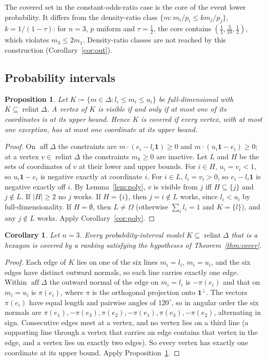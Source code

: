 \documentclass[11pt]{article}
\newcommand{\one}{\mathbf{1}}
\DeclareMathOperator{\relint}{relint}
\DeclareMathOperator{\aff}{aff}
\theoremstyle{plain}
\newtheorem{proposition}[theorem]{Proposition}
\newtheorem{corollary}[theorem]{Corollary}
\theoremstyle{definition}
\theoremstyle{remark}
\begin{document}
The covered set in the constant-odds-ratio case is the core of the event lower
probability. It differs from the density-ratio class $\{m:m_i/p_i\le km_j/p_j\}$,
$k=1/(1-\tau)$: for $n=3$, $p$ uniform and $\tau=\frac12$, the core contains
$(\frac15,\frac3{10},\frac12)$, which violates $m_3\le2m_1$. Density-ratio classes are not
reached by this construction (Corollary~\ref{cor:out}).

\subsection{Probability intervals}

\begin{proposition}\label{prop:pri}
Let $K\coloneqq\{m\in\Delta:l_i\le m_i\le u_i\}$ be full-dimensional with $K\subseteq
\relint\Delta$. A vertex of $K$ is visible if and only if at most one of its coordinates is
at its upper bound. Hence $K$ is covered if every vertex, with at most one exception, has
at most one coordinate at its upper bound.
\end{proposition}

\begin{proof}
On $\aff\Delta$ the constraints are $m\cdot(e_i-l_i\one)\ge0$ and $m\cdot(u_i\one-e_i)
\ge0$; at a vertex $v\in\relint\Delta$ the constraints $m_k\ge0$ are inactive. Let $L$ and
$H$ be the sets of coordinates of $v$ at their lower and upper bounds. For $i\in H$,
$u_i=v_i<1$, so $u_i\one-e_i$ is negative exactly at coordinate $i$. For $i\in L$,
$l_i=v_i>0$, so $e_i-l_i\one$ is negative exactly off $i$. By Lemma~\ref{lem:poly}, $v$ is
visible from $j$ iff $H\subseteq\{j\}$ and $j\notin L$. If $|H|\ge2$ no $j$ works. If
$H=\{i\}$, then $j=i\notin L$ works, since $l_i<u_i$ by full-dimensionality. If
$H=\emptyset$, then $L\neq\Omega$ (otherwise $\sum_il_i=1$ and $K=\{l\}$), and any $j\notin
L$ works. Apply Corollary~\ref{cor:poly}.
\end{proof}

\begin{corollary}\label{cor:hexagon}
Let $n=3$. Every probability-interval model $K\subseteq\relint\Delta$ that is a hexagon is
covered by a ranking satisfying the hypotheses of Theorem~\ref{thm:cover}.
\end{corollary}

\begin{proof}
Each edge of $K$ lies on one of the six lines $m_i=l_i$, $m_i=u_i$, and the six edges have
distinct outward normals, so each line carries exactly one edge. Within $\aff\Delta$ the
outward normal of the edge on $m_i=l_i$ is $-\pi(e_i)$ and that on $m_i=u_i$ is $\pi(e_i)$,
where $\pi$ is the orthogonal projection onto $\one^\perp$. The vectors $\pi(e_i)$ have
equal length and pairwise angles of $120^\circ$, so in angular order the six normals are
$\pi(e_1),-\pi(e_3),\pi(e_2),-\pi(e_1),\pi(e_3),-\pi(e_2)$, alternating in sign. Consecutive
edges meet at a vertex, and no vertex lies on a third line (a supporting line through a
vertex that carries an edge contains that vertex in the edge, and a vertex lies on exactly
two edges). So every vertex has exactly one coordinate at its upper bound. Apply
Proposition~\ref{prop:pri}.
\end{proof}
\end{document}
